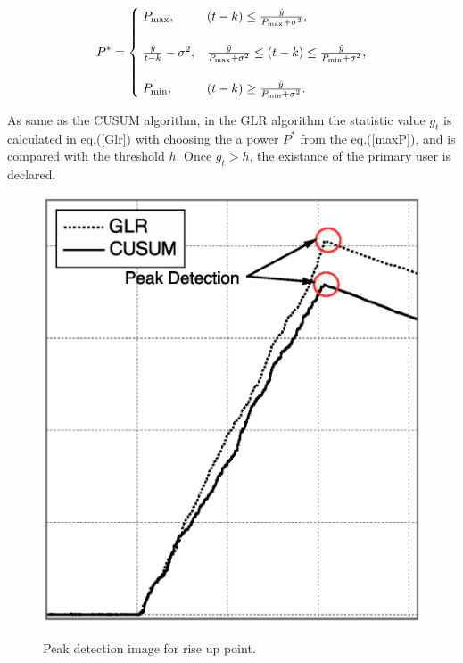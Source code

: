 \begin{align}
P^{*}=
\begin{cases}
\;P_{{\rm max}}, & (t-k)\leq\frac{\hat{y}}{P_{{\rm max}}+\sigma^2}, \\
\; \\ 
\;\frac{\hat{y}}{t-k}-\sigma^2, & \frac{\hat{y}}{P_{{\rm max}}+\sigma^2}\leq(t-k)\leq\frac{\hat{y}}{P_{{\rm min}}+\sigma^2}, \label{maxP} \\ 
\; \\
\; P_{{\rm min}}, & (t-k) \geq \frac{\hat{y}}{P_{{\rm min}}+\sigma^2}.
\end{cases}
\end{align}


As same as the CUSUM algorithm, in the GLR algorithm the statistic value $g_t$ is calculated in eq.(\ref{Glr}) with choosing the a power $P^{*}$ from the eq.(\ref{maxP}), and is compared with the threshold $h$. Once $g_t>h$, the existance of the primary user is declared.


\begin{center}
  \begin{figure}[t]
    \centering
    \includegraphics[width=120mm]{peak_OFF2ON.eps}
    \label{peak_OFF2ON}
    \caption{Peak detection image for rise up point.}
  \end{figure}
\end{center} 


